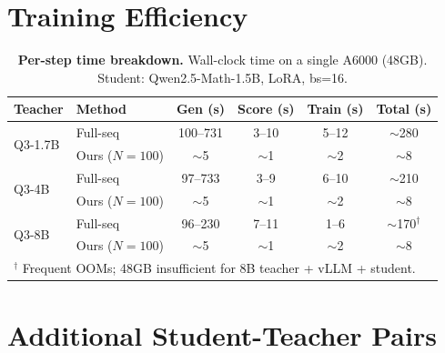 \documentclass[10pt]{article}
\begin{document}




\appendix

\section{Training Efficiency}
\label{app:timing}

\begin{table}[!htbp]
\centering
\caption{\textbf{Per-step time breakdown.} Wall-clock time on a single A6000 (48GB). Student: Qwen2.5-Math-1.5B, LoRA, bs=16.}
\label{tab:timing_detailed}
\small
\begin{tabular}{llcccc}
\toprule
\textbf{Teacher} & \textbf{Method} & \textbf{Gen (s)} & \textbf{Score (s)} & \textbf{Train (s)} & \textbf{Total (s)} \\
\midrule
\multirow{2}{*}{Q3-1.7B} & Full-seq & 100--731 & 3--10 & 5--12 & ${\sim}$280 \\
 & Ours ($N{=}100$) & ${\sim}$5 & ${\sim}$1 & ${\sim}$2 & ${\sim}$8 \\
\midrule
\multirow{2}{*}{Q3-4B} & Full-seq & 97--733 & 3--9 & 6--10 & ${\sim}$210 \\
 & Ours ($N{=}100$) & ${\sim}$5 & ${\sim}$1 & ${\sim}$2 & ${\sim}$8 \\
\midrule
\multirow{2}{*}{Q3-8B} & Full-seq & 96--230 & 7--11 & 1--6 & ${\sim}$170$^\dagger$ \\
 & Ours ($N{=}100$) & ${\sim}$5 & ${\sim}$1 & ${\sim}$2 & ${\sim}$8 \\
\bottomrule
\multicolumn{6}{l}{\footnotesize $^\dagger$ Frequent OOMs; 48GB insufficient for 8B teacher + vLLM + student.}
\end{tabular}
\end{table}


\section{Additional Student-Teacher Pairs}
\label{app:additional_pairs}
\end{document}
